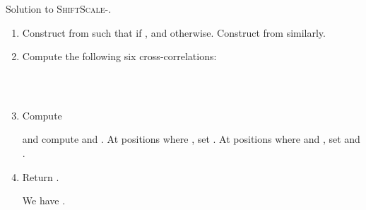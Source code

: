 \documentclass[11pt]{article}
\newcommand{\ssLtwoWild}{\textsc{ShiftScale-}\xspace}
\theoremstyle{plain}
\theoremstyle{definition}
\begin{document}
\begin{algorithm}[t]
    \caption{Solution to \ssLtwoWild.
    \label{alg:shift-scaleddistance}}
    \begin{enumerate}
        \item Construct  from  such that  if , and  otherwise. Construct  from  similarly.
        \item Compute the following six cross-correlations:

        \begin{tabular}{l}
             \\
            
        \end{tabular}
        \hfill
        \begin{tabular}{l}
             \\
            
        \end{tabular}
        \hfill
        \begin{tabular}{l}
             \\
            
        \end{tabular}

        \item Compute

        

        and compute  and . At positions  where , set . At positions  where  and , set  and .


        \item Return
            .

            We have .
    \end{enumerate}
    \vspace{-8pt}
\end{algorithm}
\end{document}
